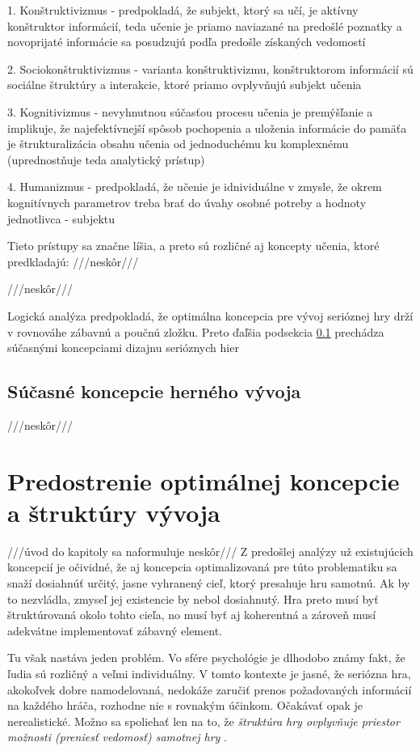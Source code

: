 \documentclass[10pt,twoside,slovak,a4paper]{article}
\begin{document}
1. Konštruktivizmus - predpokladá, že subjekt, ktorý sa učí, je aktívny konštruktor informácií, teda učenie je priamo naviazané na predošlé poznatky a novoprijaté informácie sa posudzujú podľa predošle získaných vedomostí

2. Sociokonštruktivizmus - varianta konštruktivizmu, konštruktorom informácií sú sociálne štruktúry a interakcie, ktoré priamo ovplyvňujú subjekt učenia

3.  Kognitivizmus - nevyhnutnou súčasťou procesu učenia je premýšľanie a implikuje, že najefektívnejší spôsob pochopenia a uloženia informácie do pamäťa je štrukturalizácia obsahu učenia od jednoduchému ku komplexnému (uprednostňuje teda analytický prístup)

4. Humanizmus - predpokladá, že učenie je idnividuálne v zmysle, že okrem kognitívnych parametrov treba brať do úvahy osobné potreby a hodnoty jednotlivca - subjektu

Tieto prístupy sa značne líšia, a preto sú rozličné aj koncepty učenia, ktoré predkladajú: ///neskôr///

///neskôr///

Logická analýza predpokladá, že optimálna koncepcia pre vývoj serióznej hry drží v rovnováhe zábavnú a poučnú zložku. Preto ďaľšia podsekcia \ref{jadro:vyvoj} prechádza súčasnými koncepciami dizajnu serióznych hier
\subsection{Súčasné koncepcie herného vývoja} \label{jadro:vyvoj}
///neskôr///

\section{Predostrenie optimálnej koncepcie a štruktúry vývoja} \label{riesenie}
///úvod do kapitoly sa naformuluje neskôr///
Z predošlej analýzy už existujúcich koncepcií je očividné, že aj koncepcia optimalizovaná pre túto problematiku sa snaží dosiahnúť určitý, jasne vyhranený cieľ, ktorý presahuje hru samotnú. Ak by to nezvládla, zmyseľ jej existencie by nebol dosiahnutý. Hra preto musí byť štruktúrovaná okolo tohto cieľa, no musí byť aj koherentná a zároveň musí adekvátne implementovať zábavný element.

Tu však nastáva jeden problém. Vo sfére psychológie je dlhodobo známy fakt, že ľudia sú rozličný a veľmi individuálny. V tomto kontexte je jasné, že seriózna hra, akokoľvek dobre namodelovaná, nedokáže zaručiť prenos požadovaných informácií na každého hráča, rozhodne nie s rovnakým účinkom. Očakávať opak je nerealistické. Možno sa spoliehať len na to, že \emph{štruktúra hry ovplyvňuje priestor možnosti (preniesť vedomosť) samotnej hry} \cite{mitgutsch2012purposeful}.
\end{document}
